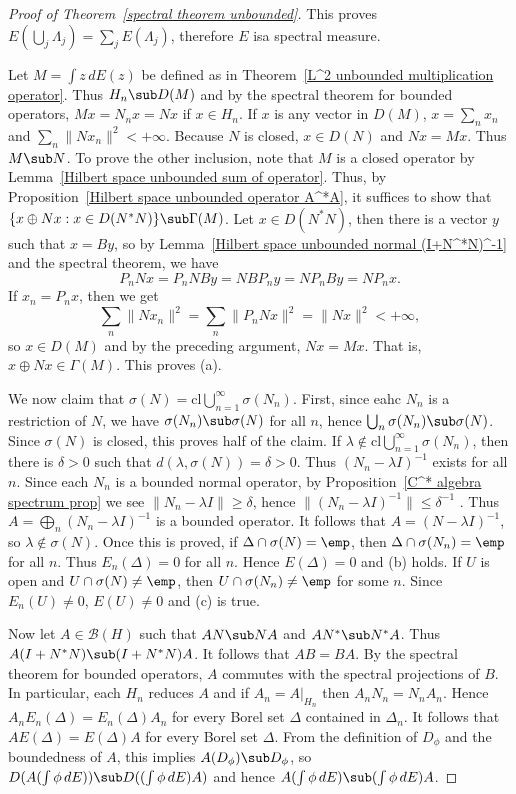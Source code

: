 \begin{proof}[Proof of Theorem~\ref{spectral theorem unbounded}]
This proves $E(\bigcup_j\Lambda_j)=\sum_jE(\Lambda_j)$, therefore $E$ isa spectral measure.\par
Let $M=\int z\,dE(z)$ be defined as in Theorem~\ref{L^2 unbounded multiplication operator}. Thus $H_n\sub D(M)$ and by the spectral theorem for bounded operators, $Mx=N_nx=Nx$ if $x\in H_n$. If $x$ is any vector in $D(M)$, $x=\sum_nx_n$ and $\sum_n\|Nx_n\|^2<+\infty$. Because $N$ is closed, $x\in D(N)$ and $Nx=Mx$. Thus $M\sub N$. To prove the other inclusion, note that $M$ is a closed operator by Lemma~\ref{Hilbert space unbounded sum of operator}. Thus, by Proposition~\ref{Hilbert space unbounded operator A^*A}, it suffices to show that $\{x\oplus Nx:x\in D(N^*N)\}\sub\Gamma(M)$. Let $x\in D(N^*N)$, then there is a vector $y$ such that $x=By$, so by Lemma~\ref{Hilbert space unbounded normal (I+N^*N)^-1} and the spectral theorem, we have
\[P_nNx=P_nNBy=NBP_ny=NP_nBy=NP_nx.\]
If $x_n=P_nx$, then we get
\[\sum_n\|Nx_n\|^2=\sum_n\|P_nNx\|^2=\|Nx\|^2<+\infty,\]
so $x\in D(M)$ and by the preceding argument, $Nx=Mx$. That is, $x\oplus Nx\in\Gamma(M)$. This proves (a).\par
We now claim that $\sigma(N)=\mathrm{cl}\bigcup_{n=1}^{\infty}\sigma(N_n)$. First, since eahc $N_n$ is a restriction of $N$, we have $\sigma(N_n)\sub\sigma(N)$ for all $n$, hence $\bigcup_n\sigma(N_n)\sub\sigma(N)$. Since $\sigma(N)$ is closed, this proves half of the claim. If $\lambda\not\in\mathrm{cl}\bigcup_{n=1}^{\infty}\sigma(N_n)$, then there is $\delta>0$ such that $d(\lambda,\sigma(N))=\delta>0$. Thus $(N_n-\lambda I)^{-1}$ exists for all $n$. Since each $N_n$ is a bounded normal operator, by Proposition~\ref{C^* algebra spectrum prop} we see $\|N_n-\lambda I\|\geq\delta$, hence $\|(N_n-\lambda I)^{-1}\|\leq\delta^{-1}$ . Thus $A=\bigoplus_n(N_n-\lambda I)^{-1}$ is a bounded operator. It follows that $A=(N -\lambda I)^{-1}$, so $\lambda\notin\sigma(N)$. Once this is proved, if $\Delta\cap\sigma(N)=\emp$, then $\Delta\cap\sigma(N_n)=\emp$ for all $n$. Thus $E_n(\Delta)=0$ for all $n$. Hence $E(\Delta)=0$ and (b) holds. If $U$ is open and $U\cap\sigma(N)\neq\emp$, then $U\cap\sigma(N_n)\neq\emp$ for some $n$. Since $E_n(U)\neq 0$, $E(U)\neq 0$ and (c) is true.\par
Now let $A\in\mathcal{B}(H)$ such that $AN\sub NA$ and $AN^*\sub N^*A$. Thus $A(I+N^*N)\sub(I+N^*N)A$. It follows that $AB=BA$. By the spectral theorem for bounded operators, $A$ commutes with the spectral projections of $B$. In particular, each $H_n$ reduces $A$ and if $A_n=A|_{H_n}$ then $A_nN_n=N_nA_n$. Hence $A_nE_n(\Delta)=E_n(\Delta)A_n$ for every Borel set $\Delta$ contained in $\Delta_n$. It follows that $AE(\Delta)=E(\Delta)A$ for every Borel set $\Delta$. From the definition of $D_\phi$ and the boundedness of $A$, this implies $A(D_\phi)\sub D_\phi$, so $D(A(\int\phi\,dE))\sub D((\int\phi\,dE)A)$ and hence $A(\int\phi\,dE)\sub (\int\phi\,dE)A$.
\end{proof}
